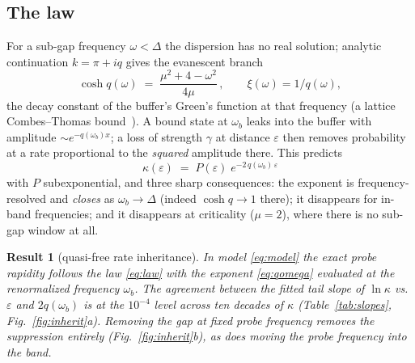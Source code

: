 \documentclass[11pt,a4paper]{article}
\newtheorem{result}{Result}
\theoremstyle{remark}
\newcommand{\eps}{\varepsilon}
\begin{document}
\subsection{The law}

For a sub-gap frequency $\omega < \Delta$ the dispersion has no real solution; analytic
continuation $k = \pi + iq$ gives the evanescent branch
\begin{equation}
  \cosh q(\omega) \;=\; \frac{\mu^2 + 4 - \omega^2}{4\mu}\,,
  \qquad \xi(\omega) = 1/q(\omega),
  \label{eq:qomega}
\end{equation}
the decay constant of the buffer's Green's function at that frequency (a lattice
Combes--Thomas bound~\cite{CombesThomas1973}). A bound state at $\omega_b$ leaks into the
buffer with amplitude $\sim e^{-q(\omega_b) x}$; a loss of strength $\gamma$ at distance
$\eps$ then removes probability at a rate proportional to the \emph{squared} amplitude
there. This predicts
\begin{equation}
  \boxed{\;\kappa(\eps) \;=\; P(\eps)\; e^{-2\,q(\omega_b)\,\eps}\;}
  \label{eq:law}
\end{equation}
with $P$ subexponential, and three sharp consequences: the exponent is frequency-resolved
and \emph{closes} as $\omega_b \to \Delta$ (indeed $\cosh q \to 1$ there); it disappears
for in-band frequencies; and it disappears at criticality ($\mu = 2$), where there is no
sub-gap window at all.

\begin{result}[quasi-free rate inheritance]
\label{res:main}
In model \eqref{eq:model} the exact probe rapidity follows the law \eqref{eq:law} with the
exponent \eqref{eq:qomega} evaluated at the renormalized frequency $\omega_b$. The
agreement between the fitted tail slope of $\ln\kappa$ vs.\ $\eps$ and $2q(\omega_b)$ is
at the $10^{-4}$ level across ten decades of $\kappa$ (Table~\ref{tab:slopes},
Fig.~\ref{fig:inherit}a). Removing the gap at fixed probe frequency removes the
suppression entirely (Fig.~\ref{fig:inherit}b), as does moving the probe frequency into
the band.
\end{result}
\end{document}
